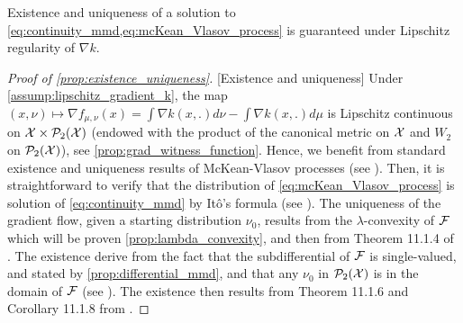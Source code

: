 
Existence and uniqueness of a solution to \cref{eq:continuity_mmd,eq:mcKean_Vlasov_process} is guaranteed under Lipschitz regularity of $\nabla k$.%
\begin{proof}[Proof of \cref{prop:existence_uniqueness}]\label{proof:prop:existence_uniqueness}[Existence and uniqueness]
Under \cref{assump:lipschitz_gradient_k}, the map $(x,\nu)\mapsto \nabla f_{\mu,\nu}(x)=\int \nabla k(x,.)d \nu - \int \nabla k(x,.) d \mu$ is Lipschitz continuous on ${{\mathcal X}} \times \mathcal{P}_2({{\mathcal X}})$ (endowed with the product of the canonical metric on ${{\mathcal X}}$ and $W_2$ on $\mathcal{P}_2({{\mathcal X}})$), see \cref{prop:grad_witness_function}. Hence, we benefit from standard existence and uniqueness results of McKean-Vlasov processes (see \cite{jourdain2007nonlinear}). Then, it is straightforward to verify that the distribution of \eqref{eq:mcKean_Vlasov_process} is solution of \eqref{eq:continuity_mmd} by Itô's formula (see \cite{ito1951stochastic}). The uniqueness of the gradient flow, given a starting distribution $\nu_0$, results from the $\lambda$-convexity of ${{\mathcal F}}$ which will be proven \cref{prop:lambda_convexity}, and then from Theorem 11.1.4 of \cite{ambrosio2008gradient}. The existence derive from the fact that the subdifferential of ${{\mathcal F}}$ is single-valued, and stated by \cref{prop:differential_mmd}, and that any $\nu_0$ in $\mathcal{P}_2({{\mathcal X}})$ is in the domain of ${{\mathcal F}}$ (see \cite{gretton2012kernel}). The existence then results from Theorem 11.1.6 and Corollary 11.1.8 from \cite{ambrosio2008gradient}.
\end{proof}

